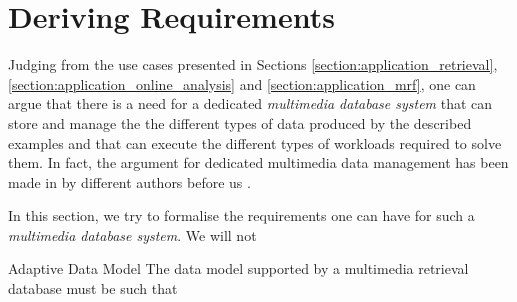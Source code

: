 \section{Deriving Requirements}
Judging from the use cases presented in Sections \ref{section:application_retrieval}, \ref{section:application_online_analysis} and \ref{section:application_mrf}, one can argue that there is a need for a dedicated \emph{multimedia database system} that can store and manage the the different types of data produced by the described examples and that can execute the different types of workloads required to solve them. In fact, the argument for dedicated multimedia data management has been made in by different authors before us \cite{Smeulders:2000Content,Zahalka:2014towards,Jonson:2016,Giangreco:2018thesis}.

In this section, we try to formalise the requirements one can have for such a \emph{multimedia database system}. We will not 

\begin{requirement}{Adaptive Data Model}
    The data model supported by a multimedia retrieval database must be such that
\end{requirement}